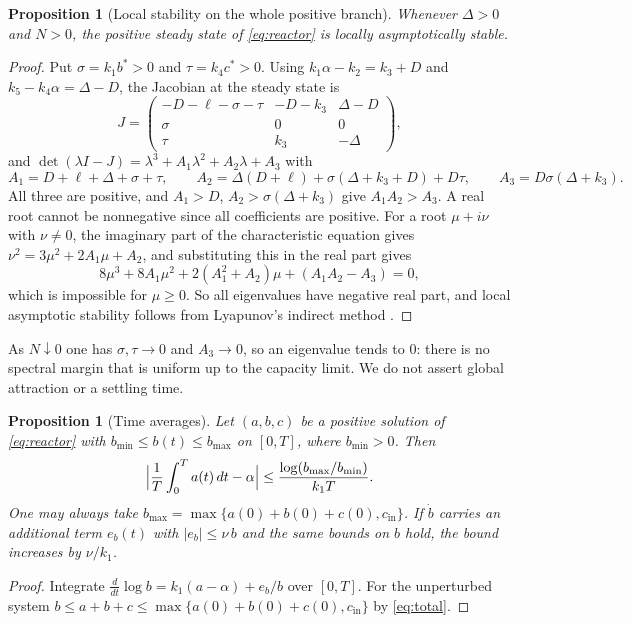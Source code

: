 \documentclass[11pt,a4paper]{article}
\theoremstyle{plain}
\newtheorem{proposition}[theorem]{Proposition}
\theoremstyle{definition}
\theoremstyle{remark}
\newcommand{\cin}{c_{\mathrm{in}}}
\begin{document}
\begin{proposition}[Local stability on the whole positive branch]\label{prop:stable}
Whenever $\Delta>0$ and $N>0$, the positive steady state of \eqref{eq:reactor} is locally asymptotically stable.
\end{proposition}
\begin{proof}
Put $\sigma=k_1b^*>0$ and $\tau=k_4c^*>0$. Using $k_1\alpha-k_2=k_3+D$ and $k_5-k_4\alpha=\Delta-D$, the Jacobian at the steady state is
\[
 J=\begin{pmatrix}-D-\ell-\sigma-\tau&-D-k_3&\Delta-D\\ \sigma&0&0\\ \tau&k_3&-\Delta\end{pmatrix},
\]
and $\det(\lambda I-J)=\lambda^3+A_1\lambda^2+A_2\lambda+A_3$ with
\[
 A_1=D+\ell+\Delta+\sigma+\tau,\qquad A_2=\Delta(D+\ell)+\sigma(\Delta+k_3+D)+D\tau,\qquad A_3=D\sigma(\Delta+k_3).
\]
All three are positive, and $A_1>D$, $A_2>\sigma(\Delta+k_3)$ give $A_1A_2>A_3$. A real root cannot be nonnegative since all coefficients are positive. For a root $\mu+i\nu$ with $\nu\neq0$, the imaginary part of the characteristic equation gives $\nu^2=3\mu^2+2A_1\mu+A_2$, and substituting this in the real part gives
\[
  8\mu^3+8A_1\mu^2+2(A_1^2+A_2)\mu+(A_1A_2-A_3)=0,
\]
which is impossible for $\mu\ge0$. So all eigenvalues have negative real part, and local asymptotic stability follows from Lyapunov's indirect method \cite[Theorem~4.7]{khalil}.
\end{proof}

As $N\downarrow0$ one has $\sigma,\tau\to0$ and $A_3\to0$, so an eigenvalue tends to $0$: there is no spectral margin that is uniform up to the capacity limit. We do not assert global attraction or a settling time.

\begin{proposition}[Time averages]\label{prop:average}
Let $(a,b,c)$ be a positive solution of \eqref{eq:reactor} with $b_{\min}\le b(t)\le b_{\max}$ on $[0,T]$, where $b_{\min}>0$. Then
\[
  \Bigl|\frac1T\int_0^Ta(t)\,dt-\alpha\Bigr|\le\frac{\log(b_{\max}/b_{\min})}{k_1T}.
\]
One may always take $b_{\max}=\max\{a(0)+b(0)+c(0),\cin\}$. If $\dot b$ carries an additional term $e_b(t)$ with $|e_b|\le\nu\,b$ and the same bounds on $b$ hold, the bound increases by $\nu/k_1$.
\end{proposition}
\begin{proof}
Integrate $\frac{d}{dt}\log b=k_1(a-\alpha)+e_b/b$ over $[0,T]$. For the unperturbed system $b\le a+b+c\le\max\{a(0)+b(0)+c(0),\cin\}$ by \eqref{eq:total}.
\end{proof}
\end{document}
